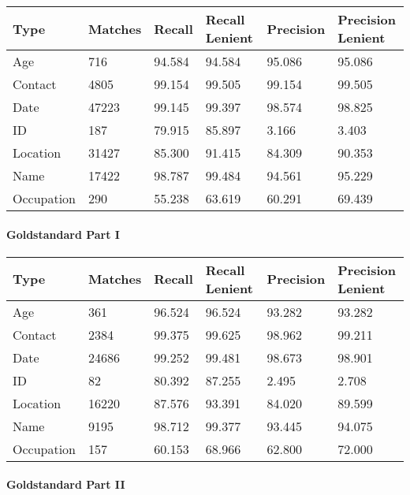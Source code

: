 \begin{longtable}[]{@{}llllll@{}}
\toprule\noalign{}
Type & Matches & Recall & Recall Lenient & Precision & Precision
Lenient \\
\midrule\noalign{}
\endhead
\bottomrule\noalign{}
\endlastfoot
Age & 716 & 94.584 & 94.584 & 95.086 & 95.086 \\
Contact & 4805 & 99.154 & 99.505 & 99.154 & 99.505 \\
Date & 47223 & 99.145 & 99.397 & 98.574 & 98.825 \\
ID & 187 & 79.915 & 85.897 & 3.166 & 3.403 \\
Location & 31427 & 85.300 & 91.415 & 84.309 & 90.353 \\
Name & 17422 & 98.787 & 99.484 & 94.561 & 95.229 \\
Occupation & 290 & 55.238 & 63.619 & 60.291 & 69.439 \\
\end{longtable}

\paragraph{Goldstandard Part I}\label{goldstandard-part-i}

\begin{longtable}[]{@{}llllll@{}}
\toprule\noalign{}
Type & Matches & Recall & Recall Lenient & Precision & Precision
Lenient \\
\midrule\noalign{}
\endhead
\bottomrule\noalign{}
\endlastfoot
Age & 361 & 96.524 & 96.524 & 93.282 & 93.282 \\
Contact & 2384 & 99.375 & 99.625 & 98.962 & 99.211 \\
Date & 24686 & 99.252 & 99.481 & 98.673 & 98.901 \\
ID & 82 & 80.392 & 87.255 & 2.495 & 2.708 \\
Location & 16220 & 87.576 & 93.391 & 84.020 & 89.599 \\
Name & 9195 & 98.712 & 99.377 & 93.445 & 94.075 \\
Occupation & 157 & 60.153 & 68.966 & 62.800 & 72.000 \\
\end{longtable}

\paragraph{Goldstandard Part II}\label{goldstandard-part-ii}

